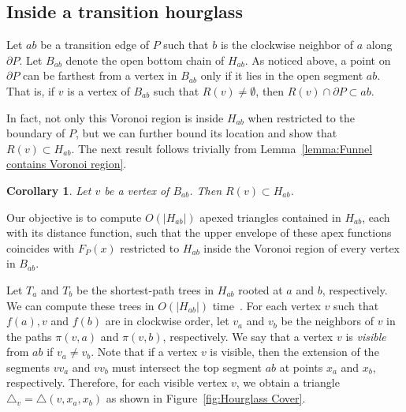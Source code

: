 \documentclass[a4paper]{article}
\newtheorem{corollary}[theorem]{Corollary}
\newcommand{\F}[2]{\ensuremath{F_{\scriptscriptstyle #1}(#2)}}
\newcommand{\fn}[2]{\ensuremath{S_{\scriptscriptstyle #1}(#2)}}
\newcommand{\ff}[1]{\ensuremath{f(#1)}}
\newcommand{\p}[2]{\ensuremath{\pi(#1, #2)}}
\begin{document}
\subsection{Inside a transition hourglass}
Let $ab$ be a transition edge of $P$  such that $b$ is the clockwise neighbor of $a$ along $\partial P$.
Let $B_{ab}$ denote the open bottom chain of $H_{ab}$.
As noticed above, a point on $\partial P$ can be farthest from a vertex in $B_{ab}$ only if it lies in the open segment $ab$.
That is, if $v$ is a vertex of $B_{ab}$ such that $R(v)\neq \emptyset$, then $R(v)\cap \partial P \subset ab$.

In fact, not only this Voronoi region is inside $H_{ab}$ when restricted to the boundary of $P$, but we can further bound its location and show that $R(v)\subset H_{ab}$. 
 The next result follows trivially from Lemma~\ref{lemma:Funnel contains Voronoi region}.

\begin{corollary}\label{lemma:Cell contained in geodesic triangle}
Let $v$ be a vertex of $B_{ab}$. Then $R(v) \subset H_{ab}$.
\end{corollary}


Our objective is to compute $O(|H_{ab}|)$ apexed triangles contained in $H_{ab}$, each with its distance function, such that the upper envelope of these apex functions coincides with $\F{P}{x}$ restricted to $H_{ab}$ inside the Voronoi region of every vertex in $B_{ab}$.

Let $T_a$ and $T_b$ be the shortest-path trees in $H_{ab}$ rooted at $a$ and $b$, respectively. 
We can compute these trees in $O(|H_{ab}|)$ time~\cite{guibasShortestPathTree}. 
For each vertex $v$ such that  $\ff{a}, v$ and $\ff{b}$ are in clockwise order, let $v_a$ and $v_b$ be the neighbors of $v$ in the paths $\p{v}{a}$ and $\p{v}{ b}$, respectively.
We say that a vertex $v$ is \emph{visible} from $ab$ if $v_a\neq v_b$.
Note that if a vertex $v$ is visible, then the extension of the  segments $vv_a$ and $vv_b$ must intersect the top segment $ab$ at points $x_a$ and $x_b$, respectively. 
Therefore, for each visible vertex $v$, we obtain a triangle $\triangle_v = \triangle(v, x_a, x_b)$ as shown in Figure~\ref{fig:Hourglass Cover}.
\end{document}
